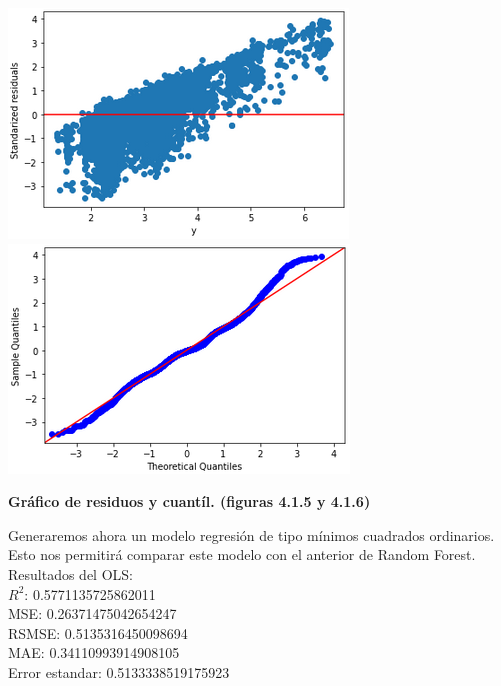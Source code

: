 \documentclass{article}
\begin{document}
    
            \includegraphics[scale=0.6]{images/residuos-stage-SVR1.PNG} 
            \includegraphics[scale=0.6]{images/residuos-stage-quantil3.PNG} \\
            \begin{center}
                \textbf{Gráfico de residuos y cuantíl. (figuras 4.1.5 y 4.1.6)}
            \end{center}
        
        
        Generaremos ahora un modelo regresión de tipo mínimos cuadrados ordinarios. Esto nos permitirá comparar este modelo con el anterior de Random Forest.\\
        
        Resultados del OLS:\\
        $R^{2}$:  0.5771135725862011\\
        MSE:  0.26371475042654247\\
        RSMSE:  0.5135316450098694\\
        MAE:  0.34110993914908105\\
        Error estandar:  0.5133338519175923\\
        
\end{document}
